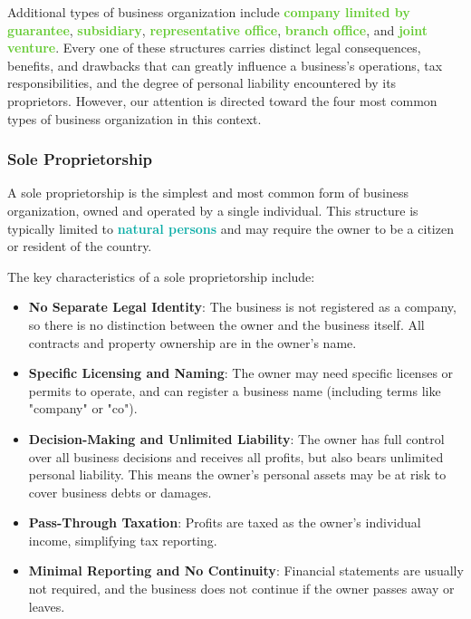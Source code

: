 \documentclass[twoside]{article}
\newcommand{\highlightbluetext}[1]{\textcolor[HTML]{09ACA6}{\textbf{#1}}}
\newcommand{\highlightgreentext}[1]{\textcolor[HTML]{62C92F}{\textbf{#1}}}
\numberwithin{equation}{section}
\begin{document}
	Additional types of business organization include \highlightgreentext{company limited by guarantee}, \highlightgreentext{subsidiary}, \highlightgreentext{representative office}, \highlightgreentext{branch office}, and \highlightgreentext{joint venture}. Every one of these structures carries distinct legal consequences, benefits, and drawbacks that can greatly influence a business's operations, tax responsibilities, and the degree of personal liability encountered by its proprietors. However, our attention is directed toward the four most common types of business organization in this context.

	\subsubsection{Sole Proprietorship}
	\label{subsubsec:SoleProprietorship}
	A sole proprietorship is the simplest and most common form of business organization, owned and operated by a single individual. This structure is typically limited to \highlightbluetext{natural persons} and may require the owner to be a citizen or resident of the country.

	The key characteristics of a sole proprietorship include:
	\begin{itemize}
	\item \textbf{No Separate Legal Identity}: The business is not registered as a company, so there is no distinction between the owner and the business itself. All contracts and property ownership are in the owner's name.
	\item \textbf{Specific Licensing and Naming}: The owner may need specific licenses or permits to operate, and can register a business name (including terms like "company" or "co").
	\item \textbf{Decision-Making and Unlimited Liability}: The owner has full control over all business decisions and receives all profits, but also bears unlimited personal liability. This means the owner's personal assets may be at risk to cover business debts or damages.
	\item \textbf{Pass-Through Taxation}: Profits are taxed as the owner's individual income, simplifying tax reporting.
	\item \textbf{Minimal Reporting and No Continuity}: Financial statements are usually not required, and the business does not continue if the owner passes away or leaves.
	\end{itemize}
\end{document}
